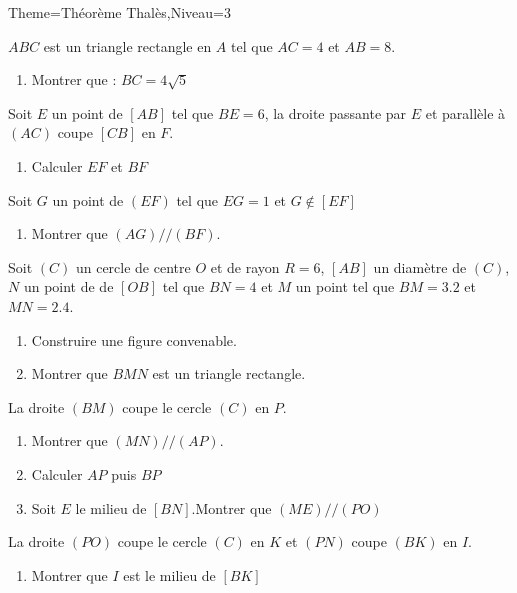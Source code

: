 \documentclass[a4paper,12pt]{article}
\begin{document}
\begin{Maquette}[Fiche]{Theme=Théorème Thalès,Niveau=3}
\begin{exercice}
$ABC$ est un triangle rectangle en $A$ tel que $AC=4$ et  $AB=8$.
\begin{enumerate}
\item Montrer que : $BC=4\sqrt{5}$
\end{enumerate}
Soit $E$ un point de $[AB]$ tel que $BE=6$, la droite passante par $E$ et parallèle à $(AC)$ coupe $[CB]$ en $F$.
\begin{enumerate}[start=2]
\item Calculer $EF$ et $BF$
\end{enumerate}
Soit  $G$ un point de $(EF)$ tel que $EG=1$ et $G\notin [EF]$
\begin{enumerate}[start=3]
\item Montrer que $(AG)//(BF)$.
\end{enumerate}
\end{exercice}

\begin{exercice}
Soit $(C)$ un cercle de centre $O$ et de rayon $R=6$, $[AB]$ un diamètre de $(C)$, $N$ un point de de $[OB]$ tel que $BN=4$ et $M$ un point tel que $BM=3.2$ et $MN=2.4$.
\begin{enumerate}
\item Construire une figure convenable.
\item Montrer que $BMN$ est un triangle rectangle.
\end{enumerate}
La droite $(BM)$ coupe le cercle $(C)$ en $P$.
\begin{enumerate}[start=3]
\item Montrer que $(MN)//(AP)$.
\item Calculer $AP$ puis $BP$
\item Soit $E$ le milieu de $[BN]$.Montrer que $(ME)//(PO)$
\end{enumerate}
La droite $(PO)$ coupe le cercle $(C)$ en $K$ et $(PN)$ coupe $(BK)$ en $I$.
\begin{enumerate}
\item Montrer que $I$ est le milieu de $[BK]$
\end{enumerate}
\end{exercice}






















\end{Maquette}
\end{document}
